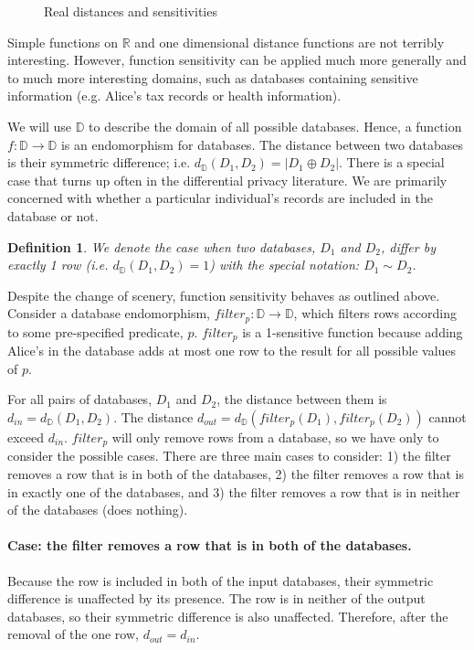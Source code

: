 \documentclass[12pt]{article}
\newtheorem{defn}{Definition}[section]
\begin{document}
\begin{figure}
    \centering
    \def\svgwidth{\columnwidth}
    
    \caption{Real distances and sensitivities}
\end{figure}

Simple functions on $\mathbb R$ and one dimensional distance functions are not terribly interesting.
However, function sensitivity can be applied much more generally and to much more interesting domains, such as databases containing sensitive information (e.g. Alice's tax records or health information).

We will use $\mathbb D$ to describe the domain of all possible databases.
Hence, a function $f : \mathbb D \rightarrow \mathbb D$ is an endomorphism for databases.
The distance between two databases is their symmetric difference; i.e. $d_{\mathbb D}(D_1,D_2) = | D_1 \oplus D_2 |$.
There is a special case that turns up often in the differential privacy literature.
We are primarily concerned with whether a particular individual's records are included in the database or not.

\begin{defn}
  We denote the case when two databases, $D_1$ and $D_2$, differ by exactly 1 row (i.e. $d_{\mathbb D}(D_1,D_2)=1$) with the special notation: $D_1 \sim D_2$.
\end{defn}

Despite the change of scenery, function sensitivity behaves as outlined above.
Consider a database endomorphism, $filter_p : \mathbb D \rightarrow \mathbb D$, which filters rows according to some pre-specified predicate, $p$.
$filter_p$ is a 1-sensitive function because adding Alice's in the database adds at most one row to the result for all possible values of $p$.

For all pairs of databases, $D_1$ and $D_2$, the distance between them is $d_{in} = d_{\mathbb D}(D_1,D_2)$.
The distance $d_{out} = d_{\mathbb D}(filter_p(D_1),filter_p(D_2))$ cannot exceed $d_{in}$.
$filter_p$ will only remove rows from a database, so we have only to consider the possible cases.
There are three main cases to consider:
1) the filter removes a row that is in both of the databases,
2) the filter removes a row that is in exactly one of the databases, and
3) the filter removes a row that is in neither of the databases (does nothing).

\paragraph{Case: the filter removes a row that is in both of the databases.}
Because the row is included in both of the input databases, their symmetric difference is unaffected by its presence.
The row is in neither of the output databases, so their symmetric difference is also unaffected.
Therefore, after the removal of the one row, $d_{out} = d_{in}$.
\end{document}
